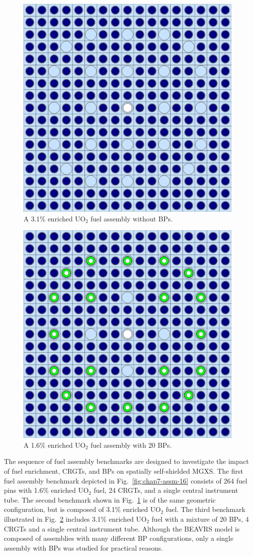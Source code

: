 \begin{figure}[h!]
  \centering
  \includegraphics[width=0.65\linewidth]{figures/benchmarks/assembly-31}
\vspace{2mm}
\caption[BEAVRS 3.1\% enriched assembly]{A 3.1\% enriched UO$_2$ fuel assembly without \acp{BP}.}
\label{fig:chap7-assm-31}
\end{figure}

\begin{figure}[h!]
  \centering
  \includegraphics[width=0.65\linewidth]{figures/benchmarks/assembly-31-20BPs}
\vspace{2mm}
\caption[BEAVRS 3.1\% enriched assembly with 20 \ac{BP}s]{A 1.6\% enriched UO$_2$ fuel assembly with 20 \acp{BP}.}
\label{fig:chap7-assm-31-20BPs}
\end{figure}

The sequence of fuel assembly benchmarks are designed to investigate the impact of fuel enrichment, \acp{CRGT}, and \acp{BP} on spatially self-shielded \ac{MGXS}. The first fuel assembly benchmark depicted in Fig.~\ref{fig:chap7-assm-16} consists of 264 fuel pins with 1.6\% enriched UO$_2$ fuel, 24 \acp{CRGT}, and a single central instrument tube. The second benchmark shown in Fig.~\ref{fig:chap7-assm-31} is of the same geometric configuration, but is composed of 3.1\% enriched UO$_2$ fuel. The third benchmark illustrated in Fig.~\ref{fig:chap7-assm-31-20BPs} includes 3.1\% enriched UO$_2$ fuel with a mixture of 20 \acp{BP}, 4 \acp{CRGT} and a single central instrument tube. Although the \ac{BEAVRS} model is composed of assemblies with many different \ac{BP} configurations, only a single assembly with \acp{BP} was studied for practical reasons.

